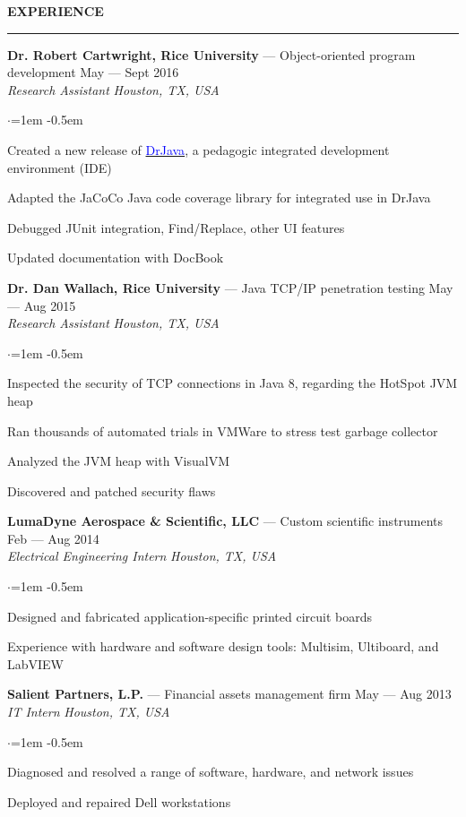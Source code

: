 \documentclass[10pt, a4paper]{article}
\newenvironment{aSection}[1]{
    \medskip \textbf{\uppercase{#1}}
    \smallskip
    \hrule
    \begin{list}{}{
            \setlength{\leftmargin}{1.5em}
        }
    \item[]
    }{
    \end{list}
}
\newenvironment{aSubsection}[4]{
    {#1} \hfill {#2} \\
    \textit{#3} \hfill \textit{#4}
    \smallskip
    \begin{list}{$\cdot$}{\leftmargin=1em}
    \itemsep -0.5em \vspace{-0.5em}
    }{
    \end{list}
    \vspace{0.5em}
}
\begin{document}
\begin{aSection}{Experience}
    \begin{aSubsection}
        {\textbf{Dr. Robert Cartwright, Rice University} --- Object-oriented program development}
        {May --- Sept 2016}
        {Research Assistant}
        {Houston, TX, USA}
    \item Created a new release of \href{http://www.drjava.org}{\textcolor{blue}{DrJava}}, a
        pedagogic integrated development environment (IDE)
    \item Adapted the JaCoCo Java code coverage library for integrated use in DrJava
    \item Debugged JUnit integration, Find/Replace, other UI features
    \item Updated documentation with DocBook
    \end{aSubsection}

    \begin{aSubsection}
        {\textbf{Dr. Dan Wallach, Rice University} --- Java TCP/IP penetration testing}
        {May --- Aug 2015}
        {Research Assistant}
        {Houston, TX, USA}
    \item Inspected the security of TCP connections in Java 8, regarding the HotSpot JVM heap
    \item Ran thousands of automated trials in VMWare to stress test garbage collector
    \item Analyzed the JVM heap with VisualVM
    \item Discovered and patched security flaws
    \end{aSubsection}

    \begin{aSubsection}
        {\textbf{LumaDyne Aerospace \& Scientific, LLC} --- Custom scientific
        instruments}
        {Feb --- Aug 2014}
        {Electrical Engineering Intern}
        {Houston, TX, USA}
    \item Designed and fabricated application-specific printed circuit boards
    \item Experience with hardware and software design tools: Multisim, Ultiboard, and LabVIEW
    \end{aSubsection}

    \begin{aSubsection}
        {\textbf{Salient Partners, L.P.} --- Financial assets management firm}
        {May --- Aug 2013}
        {IT Intern}
        {Houston, TX, USA}
    \item Diagnosed and resolved a range of software, hardware, and network issues
    \item Deployed and repaired Dell workstations
    \end{aSubsection}
\end{aSection}
\end{document}
